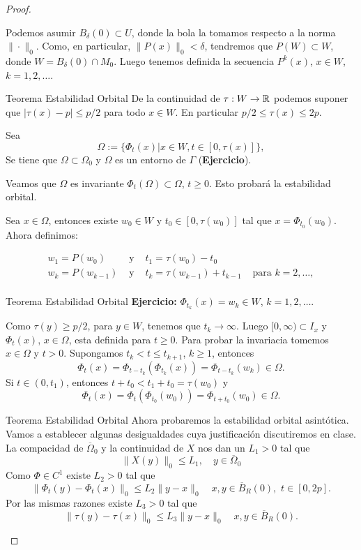 \begin{proof}
\begin{ejemplo}
Podemos asumir $B_{\delta}(0)\subset U$, donde la bola la tomamos respecto a la norma $\|\cdot\|_0$. Como, en particular, $\|P(x)\|_0<\delta$, tendremos que $P(W)\subset W$,
donde $W=B_{\delta}(0)\cap M_0$. Luego tenemos definida la secuencia $P^k(x)$, $x\in W$, $k=1,2,\ldots$. 








{Teorema Estabilidad Orbital}
De la continuidad de $\tau:W\to\mathbb{R}$ podemos suponer que $|\tau(x)-p|\leq p/2$ para todo $x\in W$. En particular $p/2\leq \tau(x)\leq 2p$. 

Sea 
\[\Omega:=\{\Phi_t(x)|x\in W, t\in [0,\tau(x)]\},\]
Se tiene que $\Omega\subset \Omega_0$ y $\Omega$ es un entorno de $\Gamma$ (\textbf{Ejercicio}). 

Veamos que $\Omega$ es invariante $\Phi_t(\Omega)\subset\Omega$, $t\geq 0$. Esto probará la estabilidad orbital. 

Sea $x\in\Omega$, entonces existe $w_0\in W$ y $t_0\in[0,\tau(w_0)]$ tal que $x=\Phi_{t_0}(w_0)$. Ahora definimos:

\[
 \begin{array}{cccc}
 w_{1}=P(w_{0})  &  \text{ y }  &    t_1=\tau(w_{0})-t_{0}     &  \\
    w_{k}=P(w_{k-1})  &  \text{ y }  &    t_k=\tau(w_{k-1})+t_{k-1}     &      \text{ para } k=2,\ldots,\\
 \end{array}
\]




{Teorema Estabilidad Orbital}
\textbf{Ejercicio:} $\Phi_{t_k}(x)=w_k\in W$, $k=1,2,\ldots$.

Como $\tau(y)\geq p/2$, para $y\in W$, tenemos que $t_k\to\infty$. Luego $[0,\infty)\subset I_x$ y $\Phi_t(x)$, $x\in\Omega$, esta definida para $t\geq 0$. Para probar la 
invariacia tomemos $x\in\Omega$ y $t>0$. Supongamos $t_k<t\leq t_{k+1}$, $k\geq 1$, entonces
\[
 \Phi_t(x)=\Phi_{t-t_k}\left(\Phi_{t_k}(x)\right)=\Phi_{t-t_k}(w_k)\in\Omega.
\]
Si $t\in (0,t_1)$, entonces $t+t_0<t_1+t_0=\tau(w_0)$ y 
\[
 \Phi_t(x)=\Phi_{t}\left(\Phi_{t_0}(w_0)\right)=\Phi_{t+t_0}(w_0)\in\Omega.
\]








{Teorema Estabilidad Orbital}
Ahora probaremos la estabilidad orbital asintótica.  Vamos a establecer algunas desigualdades cuya justificación discutiremos en clase. La compacidad de
$\overline{\Omega}_0$ y la continuidad de $X$ nos dan un $L_1>0$ tal que
\[\|X(y)\|_0\leq L_1, \quad y\in\overline{\Omega}_0\]
Como $\Phi\in C^1$ existe $L_2>0$ tal  que 
\[\|\Phi_t(y)-\Phi_t(x)\|_0\leq L_2\|y-x\|_0\quad x,y\in \overline{B}_R(0),\,\, t\in[0,2p].\]
Por las mismas razones existe $L_3>0$ tal  que 
\[\|\tau(y)-\tau(x)\|_0\leq L_3\|y-x\|_0\quad x,y\in \overline{B}_R(0).\] 




\end{ejemplo}
\end{proof}
